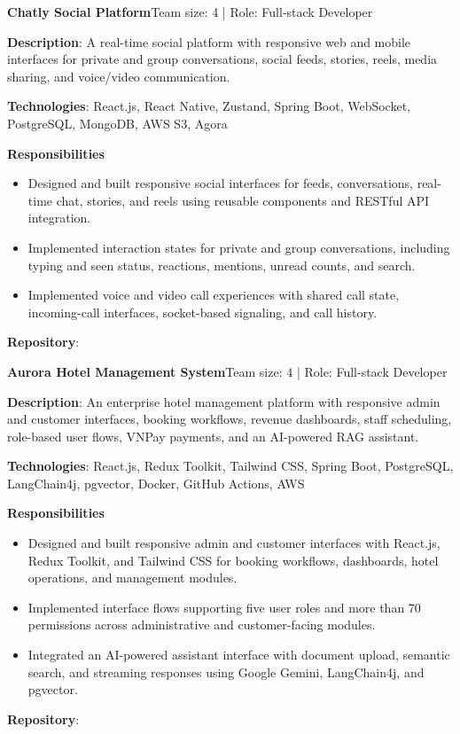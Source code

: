   \resumeProjectHeading
    {\textbf{Chatly Social Platform}}{Team size: 4 | Role: Full-stack Developer}
    \resumeItemListStart
      \item \textbf{Description}: A real-time social platform with responsive web and mobile interfaces for private and group conversations, social feeds, stories, reels, media sharing, and voice/video communication.
      \item \textbf{Technologies}: React.js, React Native, Zustand, Spring Boot, WebSocket, PostgreSQL, MongoDB, AWS S3, Agora
      \item \textbf{Responsibilities}
        \begin{itemize}
          \item Designed and built responsive social interfaces for feeds, conversations, real-time chat, stories, and reels using reusable components and RESTful API integration.
          \item Implemented interaction states for private and group conversations, including typing and seen status, reactions, mentions, unread counts, and search.
          \item Implemented voice and video call experiences with shared call state, incoming-call interfaces, socket-based signaling, and call history.
        \end{itemize}
      \item \textbf{Repository}: \href{https://github.com/nvminh162/chatly-social-platform}{}
    \resumeItemListEnd

  \resumeProjectHeading
    {\textbf{Aurora Hotel Management System}}{Team size: 4 | Role: Full-stack Developer}
    \resumeItemListStart
      \item \textbf{Description}: An enterprise hotel management platform with responsive admin and customer interfaces, booking workflows, revenue dashboards, staff scheduling, role-based user flows, VNPay payments, and an AI-powered RAG assistant.
      \item \textbf{Technologies}: React.js, Redux Toolkit, Tailwind CSS, Spring Boot, PostgreSQL, LangChain4j, pgvector, Docker, GitHub Actions, AWS
      \item \textbf{Responsibilities}
        \begin{itemize}
          \item Designed and built responsive admin and customer interfaces with React.js, Redux Toolkit, and Tailwind CSS for booking workflows, dashboards, hotel operations, and management modules.
          \item Implemented interface flows supporting five user roles and more than 70 permissions across administrative and customer-facing modules.
          \item Integrated an AI-powered assistant interface with document upload, semantic search, and streaming responses using Google Gemini, LangChain4j, and pgvector.
        \end{itemize}
      \item \textbf{Repository}: \href{https://github.com/nvminh162/aurora-hotel-management-system}{}
    \resumeItemListEnd

\resumeSubHeadingListEnd
